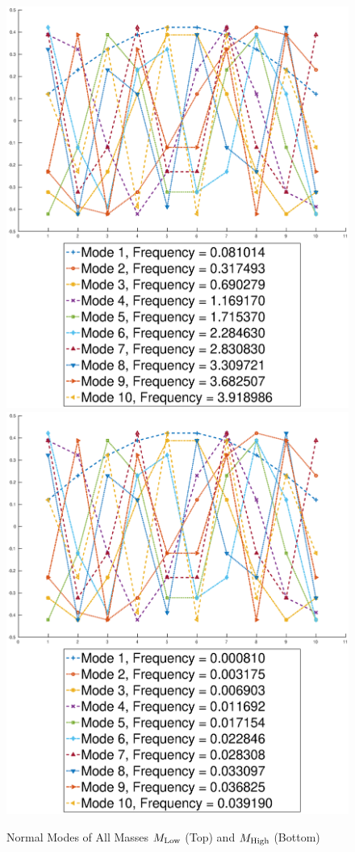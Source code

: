 \documentclass[10pt,a4paper]{article}
\begin{document}
\begin{multicols*}{2}
\begin{figure}[H]	
	\includegraphics[width=\columnwidth]{figures/low-all.eps}
	\includegraphics[width=\columnwidth]{figures/high-all.eps}
	\caption{Normal Modes of All Masses $M_{\rm{Low}}$ (Top) and $M_{\rm{High}}$ (Bottom)}
	\label{fig: constant-mass}
\end{figure}


\end{multicols*}
\end{document}
